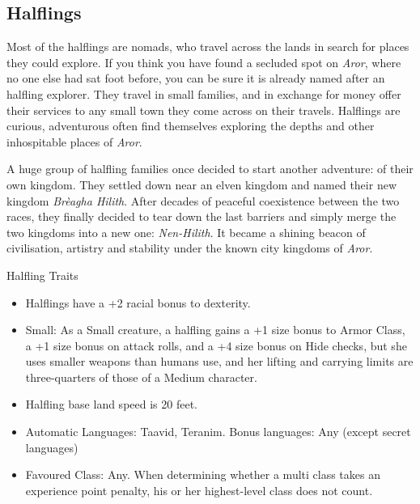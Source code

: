 \subsection{Halflings}
\label{sec:Halflings}

Most of the halflings are nomads, who travel across the lands in search for
places they could explore. If you think you have found a secluded spot on
\emph{Aror}, where no one else had sat foot before, you can be sure it is
already named after an halfling explorer. They travel in small families, and
in exchange for money offer their services to any small town they come across
on their travels. Halflings are curious, adventurous often find themselves
exploring the depths and other inhospitable places of \emph{Aror}.

A huge group of halfling families once decided to start another adventure: of
their own kingdom. They settled down near an elven kingdom and named their new
kingdom \emph{Brèagha Hilith}. After decades of peaceful coexistence between
the two races, they finally decided to tear down the last barriers and simply
merge the two kingdoms into a new one: \emph{Nen-Hilith}. It became a shining
beacon of civilisation, artistry and stability under the known city kingdoms
of \emph{Aror}.


\begin{35e}{Halfling Traits}
  \begin{itemize}[noitemsep]
    \item Halflings have a +2 racial bonus to dexterity.
    \item Small: As a Small creature, a halfling gains a +1 size bonus to
    Armor Class, a +1 size bonus on attack rolls, and a +4 size bonus on Hide
    checks, but she uses smaller weapons than humans use, and her lifting and
    carrying limits are three-quarters of those of a Medium character.
    \item Halfling base land speed is 20 feet.
    \item Automatic Languages: Taavid, Teranim. Bonus languages: Any
    (except secret languages)
    \item Favoured Class: Any. When determining whether a multi class takes an
          experience point penalty, his or her highest-level class does not
          count.
  \end{itemize}
\end{35e}
